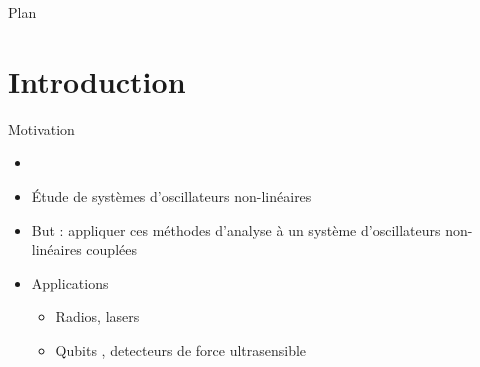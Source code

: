 \frame{\titlepage}

\small

\begin{frame}{Plan}
  \tableofcontents
\end{frame}



\section{Introduction}
\begin{frame}{Motivation}
  \begin{itemize}
    \item 
    \item Étude de systèmes d'oscillateurs non-linéaires
    \item But : appliquer ces méthodes d'analyse à un système d'oscillateurs non-linéaires couplées
    \item Applications
    \begin{itemize}
      \item Radios, lasers
      \item Qubits \cite{pistolesi_proposal_2021}, detecteurs de force ultrasensible \cite{moser_ultrasensitive_2013}
    \end{itemize}
  \end{itemize}
\end{frame}

